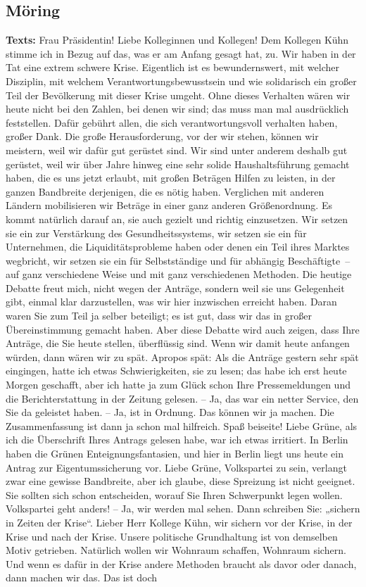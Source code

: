 \documentclass{article}
\begin{document}
\subsection{Möring}
\noindent\textbf{Texts:} Frau Präsidentin! Liebe Kolleginnen und Kollegen! Dem Kollegen Kühn stimme ich in Bezug auf das, was er am Anfang gesagt hat, zu. Wir haben in der Tat eine extrem schwere Krise. Eigentlich ist es bewundernswert, mit welcher Disziplin, mit welchem Verantwortungsbewusstsein und wie solidarisch ein großer Teil der Bevölkerung mit dieser Krise umgeht. Ohne dieses Verhalten wären wir heute nicht bei den Zahlen, bei denen wir sind; das muss man mal ausdrücklich feststellen. Dafür gebührt allen, die sich verantwortungsvoll verhalten haben, großer Dank.  Die große Herausforderung, vor der wir stehen, können wir meistern, weil wir dafür gut gerüstet sind. Wir sind unter anderem deshalb gut gerüstet, weil wir über Jahre hinweg eine sehr solide Haushaltsführung gemacht haben, die es uns jetzt erlaubt, mit großen Beträgen Hilfen zu leisten, in der ganzen Bandbreite derjenigen, die es nötig haben. Verglichen mit anderen Ländern mobilisieren wir Beträge in einer ganz anderen Größenordnung. Es kommt natürlich darauf an, sie auch gezielt und richtig einzusetzen. Wir setzen sie ein zur Verstärkung des Gesundheitssystems, wir setzen sie ein für Unternehmen, die Liquiditätsprobleme haben oder denen ein Teil ihres Marktes wegbricht, wir setzen sie ein für Selbstständige und für abhängig Beschäftigte – auf ganz verschiedene Weise und mit ganz verschiedenen Methoden. Die heutige Debatte freut mich, nicht wegen der Anträge, sondern weil sie uns Gelegenheit gibt, einmal klar darzustellen, was wir hier inzwischen erreicht haben. Daran waren Sie zum Teil ja selber beteiligt; es ist gut, dass wir das in großer Übereinstimmung gemacht haben.  Aber diese Debatte wird auch zeigen, dass Ihre Anträge, die Sie heute stellen, überflüssig sind. Wenn wir damit heute anfangen würden, dann wären wir zu spät. Apropos spät: Als die Anträge gestern sehr spät eingingen, hatte ich etwas Schwierigkeiten, sie zu lesen; das habe ich erst heute Morgen geschafft, aber ich hatte ja zum Glück schon Ihre Pressemeldungen und die Berichterstattung in der Zeitung gelesen.  – Ja, das war ein netter Service, den Sie da geleistet haben.  – Ja, ist in Ordnung. Das können wir ja machen. Die Zusammenfassung ist dann ja schon mal hilfreich. Spaß beiseite! Liebe Grüne, als ich die Überschrift Ihres Antrags gelesen habe, war ich etwas irritiert. In Berlin haben die Grünen Enteignungsfantasien,  und hier in Berlin liegt uns heute ein Antrag zur Eigentumssicherung vor. Liebe Grüne, Volkspartei zu sein, verlangt zwar eine gewisse Bandbreite,  aber ich glaube, diese Spreizung ist nicht geeignet.  Sie sollten sich schon entscheiden, worauf Sie Ihren Schwerpunkt legen wollen. Volkspartei geht anders!  – Ja, wir werden mal sehen. Dann schreiben Sie: „sichern in Zeiten der Krise“. Lieber Herr Kollege Kühn, wir sichern vor der Krise, in der Krise und nach der Krise. Unsere politische Grundhaltung ist von demselben Motiv getrieben. Natürlich wollen wir Wohnraum schaffen, Wohnraum sichern. Und wenn es dafür in der Krise andere Methoden braucht als davor oder danach, dann machen wir das. Das ist doch 
\end{document}
